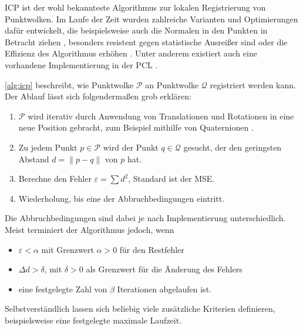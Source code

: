 \ac{ICP} \cite{besl1992method} ist der wohl bekannteste Algorithmus zur lokalen Registrierung von Punktwolken.
Im Laufe der Zeit wurden zahlreiche Varianten und Optimierungen dafür entwickelt, die beispielsweise auch die Normalen in den Punkten in Betracht ziehen \cite{munch2010modified}, besonders resistent gegen statistische Ausreißer sind \cite{bouaziz2013sparse} oder die Effizienz des Algorithmus erhöhen \cite{rusinkiewicz2001efficient}. Unter anderem existiert auch eine vorhandene Implementierung in der \ac{PCL} \cite{holz2015registration}.

\autoref{alg:icp} beschreibt, wie Punktwolke $\mathcal{P}$ an Punktwolke $\mathcal{Q}$ registriert werden kann.
Der Ablauf lässt sich folgendermaßen grob erklären:

\begin{enumerate}
\item $\mathcal{P}$ wird iterativ durch Anwendung von Translationen und Rotationen in eine neue Position gebracht, zum Beispiel mithilfe von Quaternionen \cite{horn1987closed}.
\item Zu jedem Punkt $p \in \mathcal{P}$ wird der Punkt $q \in \mathcal{Q}$ gesucht, der den geringsten Abstand $d = \|p - q\|$ von $p$ hat.
\item Berechne den Fehler $\varepsilon = \sum d^2$, Standard ist der \ac{MSE}.
\item Wiederholung, bis eine der Abbruchbedingungen eintritt.
\end{enumerate}

Die Abbruchbedingungen sind dabei je nach Implementierung unterschiedlich.
Meist terminiert der Algorithmus jedoch, wenn

\begin{itemize}
\item $\varepsilon < \alpha$ mit Grenzwert $\alpha > 0$ für den Restfehler
\item $\Delta d > \delta$, mit $\delta > 0$ als Grenzwert für die Änderung des Fehlers
\item eine festgelegte Zahl von $\beta$ Iterationen abgelaufen ist.
\end{itemize}

Selbstverständlich lassen sich beliebig viele zusätzliche Kriterien definieren, beispielsweise eine festgelegte maximale Laufzeit.


